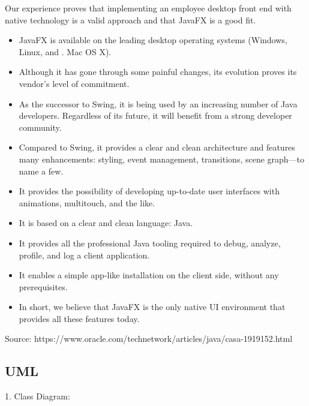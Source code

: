 \documentclass[a4paper,10pt]{article}
\begin{document}
Our experience proves that implementing an employee desktop front end with native technology is a valid approach and that JavaFX is a good fit.
\begin{itemize}
	\item JavaFX is available on the leading desktop operating systems (Windows, Linux, and . Mac OS X).
	\item Although it has gone through some painful changes, its evolution proves its       vendor's level of commitment.
	\item As the successor to Swing, it is being used by an increasing number of Java developers. Regardless of its future, it will benefit from a strong developer community.
	\item Compared to Swing, it provides a clear and clean architecture and features many enhancements: styling, event management, transitions, scene graph—to name a few.
	\item It provides the possibility of developing up-to-date user interfaces with animations, multitouch, and the like.
	\item It is based on a clear and clean language: Java.
	\item It provides all the professional Java tooling required to debug, analyze, profile, and log a client application.
	\item It enables a simple app-like installation on the client side, without any prerequisites.
	\item In short, we believe that JavaFX is the only native UI environment that provides all these features today.
\end{itemize}

Source: https://www.oracle.com/technetwork/articles/java/casa-1919152.html
\paragraph{}




\subsection{UML} 

1. Class Diagram:
\end{document}
